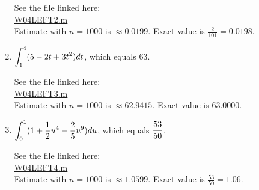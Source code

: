 \begin{enumerate}[1.]
\begin{Solution}
See the file linked here: \\ 
\href{http://www.mast.queensu.ca/~apsc171/MNTCP01/PracticeProblems/MATLAB/W04LEFT2.m}{W04LEFT2.m} \\
  Estimate with $n = 1000$ is $\approx 0.0199$.  Exact value is $\frac{2}{101} = 0.0198$.
  
\end{Solution}

\item \begin{Question}
  $\displaystyle \int_{1}^4 (5 - 2t +3t^2) dt$, which equals 63.
\end{Question}

\begin{Solution}
See the file linked here: \\ 
\href{http://www.mast.queensu.ca/~apsc171/MNTCP01/PracticeProblems/MATLAB/W04LEFT3.m}{W04LEFT3.m} \\
  Estimate with $n = 1000$ is $\approx 62.9415$.  Exact value is 63.0000.
  
\end{Solution}

\item \begin{Question} \label{qmat2}
    $\displaystyle \int_0^1 (1 + \frac{1}{2} u^4 - \frac{2}{5} u^9) du$, which
    equals $\displaystyle \frac{53}{50}$.
\end{Question}

\begin{Solution}
See the file linked here: \\ 
\href{http://www.mast.queensu.ca/~apsc171/MNTCP01/PracticeProblems/MATLAB/W04LEFT4.m}{W04LEFT4.m} \\
  Estimate with $n = 1000$ is $\approx 1.0599$.  Exact value is $\frac{53}{50} = 1.06$.
\end{Solution}

\end{enumerate}

 
